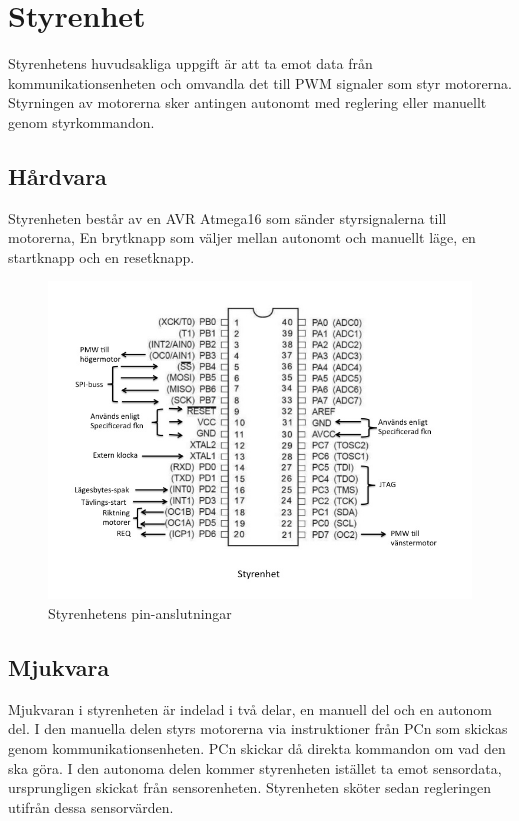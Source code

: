 \section{Styrenhet}

Styrenhetens huvudsakliga uppgift är att ta emot data från
kommunikationsenheten och omvandla det till PWM signaler som styr motorerna.
Styrningen av motorerna sker antingen autonomt med reglering eller 
manuellt genom styrkommandon.

\subsection{Hårdvara}

Styrenheten består av en AVR Atmega16 som sänder styrsignalerna till motorerna, 
En brytknapp som väljer mellan autonomt och manuellt läge, en startknapp och en 
resetknapp.  

\begin{figure}[H]
  \centering
 \includegraphics[angle=0,scale=0.5]{bilder/PIN_styr.jpg}
  \caption{Styrenhetens pin-anslutningar}
  \label{fig:PINstyr}
\end{figure}


\subsection{Mjukvara}

Mjukvaran i styrenheten är indelad i två delar, en manuell del och en autonom del.
I den manuella delen styrs motorerna via instruktioner från PCn som skickas 
genom kommunikationsenheten. PCn skickar då direkta kommandon om vad 
den ska göra. I den autonoma delen kommer styrenheten istället ta emot 
sensordata, ursprungligen skickat från sensorenheten. Styrenheten sköter sedan 
regleringen utifrån dessa sensorvärden.

